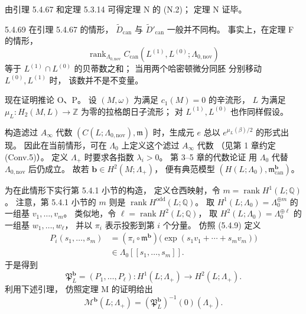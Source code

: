 由引理 5.4.67 和定理 5.3.14
可得定理 N 的 \textup{(N.2)}；
定理 N 证毕。

\begin{remark}{5.4.69}\label{rem:5-4-69}
在引理 5.4.67 的情形，
$\widetilde D_{\mathrm{can}}$
与 $\widetilde D'_{\mathrm{can}}$
一般并不同构。
事实上，在定理 F 的情形，
\[
\operatorname{rank}_{\Lambda_{0,\mathrm{nov}}}
C_{\mathrm{can}}(L^{(1)},L^{(0)};
\Lambda_{0,\mathrm{nov}})
\]
等于 $L^{(1)}\cap L^{(0)}$
的贝蒂数之和；
当用两个哈密顿微分同胚
分别移动 $L^{(0)},L^{(1)}$ 时，
该数并不是不变量。
\end{remark}

现在证明推论 O、P。
设 $(M,\omega)$ 为满足 $c_1(M)=0$
的辛流形，
$L$ 为满足
$\mu_L:H_2(M,L)\to\mathbb Z$
为零的拉格朗日子流形；
对 $L^{(1)},L^{(0)}$
也作同样假设。

构造滤过 $A_\infty$ 代数
$(C(L;\Lambda_{0,\mathrm{nov}}),\mathfrak m)$
时，生成元 $e$ 总以
$e^{\mu_L(\beta)/2}$ 的形式出现。
因此在当前情形，可在
$\Lambda_0$ 上定义这个滤过
$A_\infty$ 代数
（见第 1 章约定 \textup{(Conv.5)}）。
定义 $\Lambda_+$ 时要求各指数
$\lambda_i>0$。
第 3--5 章的代数论证
用 $\Lambda_0$ 代替
$\Lambda_{0,\mathrm{nov}}$
后仍成立。
故若
$\mathbf b\in H^2(M;\Lambda_+)$，
便有典范模型
$(H(L;\Lambda_0),
\mathfrak m_{\mathrm{can}}^{\mathbf b})$。

为在此情形下实行第 5.4.1 小节的构造，
定义仓西映射，令
$m=\operatorname{rank}H^1(L;\mathbb Q)$。
注意，第 5.4.1 小节的 $m$
则是 $\operatorname{rank}H^{\mathrm{odd}}
(L;\mathbb Q)$。
取 $H^1(L;\Lambda_0)
=\Lambda_0^{\oplus m}$
的一组基
$v_1,\ldots,v_m$。
类似地，令
$\ell=\operatorname{rank}H^2(L;\mathbb Q)$，
取 $H^2(L;\Lambda_0)
=\Lambda_0^{\oplus\ell}$
的一组基
$w_1,\ldots,w_\ell$，
并以 $\pi_i$
表示投影到第 $i$ 个分量。
仿照 (5.4.9) 定义
\begin{equation}
\begin{aligned}
P_i(s_1,\ldots,s_m)
&=(\pi_i\circ\mathfrak m^{\mathbf b})
\bigl(\exp(s_1v_1+\cdots+s_mv_m)\bigr)\\
&\in\Lambda_0[[s_1,\ldots,s_m]].
\end{aligned}
\tag{5.4.70}\label{eq:5-4-70}
\end{equation}
于是得到
\[
\mathfrak P_L^{\mathbf b}
=(P_1,\ldots,P_\ell):
H^1(L;\Lambda_+)
\longrightarrow H^2(L;\Lambda_+).
\]
利用下述引理，
仿照定理 M 的证明给出
\[
\mathcal M^{\mathbf b}(L;\Lambda_+)
=
(\mathfrak P_L^{\mathbf b})^{-1}
(0)(\Lambda_+).
\]

